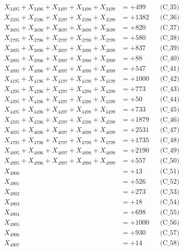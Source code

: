 \documentclass[a4paper,10pt]{article}
\begin{document}
{\begin{align}
X_{3495} + X_{3496} + X_{3497} + X_{3498} + X_{3499} &= +499 && \text{(C\_35)} \\
\allowbreak
X_{3595} + X_{3596} + X_{3597} + X_{3598} + X_{3599} &= +1382 && \text{(C\_36)} \\
X_{3695} + X_{3696} + X_{3697} + X_{3698} + X_{3699} &= +820 && \text{(C\_37)} \\
X_{3795} + X_{3796} + X_{3797} + X_{3798} + X_{3799} &= +580 && \text{(C\_38)} \\
X_{3895} + X_{3896} + X_{3897} + X_{3898} + X_{3899} &= +837 && \text{(C\_39)} \\
X_{3995} + X_{3996} + X_{3997} + X_{3998} + X_{3999} &= +88 && \text{(C\_40)} \\
\allowbreak
X_{4095} + X_{4096} + X_{4097} + X_{4098} + X_{4099} &= +547 && \text{(C\_41)} \\
X_{4195} + X_{4196} + X_{4197} + X_{4198} + X_{4199} &= +1000 && \text{(C\_42)} \\
X_{4295} + X_{4296} + X_{4297} + X_{4298} + X_{4299} &= +773 && \text{(C\_43)} \\
X_{4395} + X_{4396} + X_{4397} + X_{4398} + X_{4399} &= +50 && \text{(C\_44)} \\
X_{4495} + X_{4496} + X_{4497} + X_{4498} + X_{4499} &= +733 && \text{(C\_45)} \\
\allowbreak
X_{4595} + X_{4596} + X_{4597} + X_{4598} + X_{4599} &= +1879 && \text{(C\_46)} \\
X_{4695} + X_{4696} + X_{4697} + X_{4698} + X_{4699} &= +2531 && \text{(C\_47)} \\
X_{4795} + X_{4796} + X_{4797} + X_{4798} + X_{4799} &= +1735 && \text{(C\_48)} \\
X_{4895} + X_{4896} + X_{4897} + X_{4898} + X_{4899} &= +2190 && \text{(C\_49)} \\
X_{4995} + X_{4996} + X_{4997} + X_{4998} + X_{4999} &= +557 && \text{(C\_50)} \\
\allowbreak
X_{4900} &= +13 && \text{(C\_51)} \\
X_{4901} &= +526 && \text{(C\_52)} \\
X_{4902} &= +273 && \text{(C\_53)} \\
X_{4903} &= +18 && \text{(C\_54)} \\
X_{4904} &= +698 && \text{(C\_55)} \\
\allowbreak
X_{4905} &= +1000 && \text{(C\_56)} \\
X_{4906} &= +930 && \text{(C\_57)} \\
X_{4907} &= +14 && \text{(C\_58)} \\

\end{align}}
\end{document}
